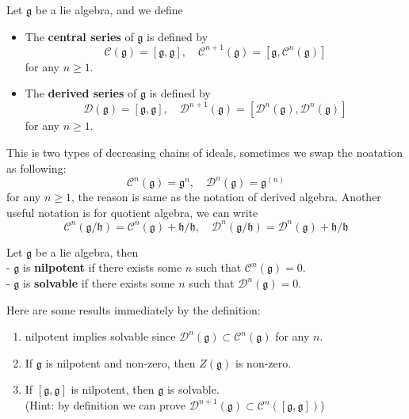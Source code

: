 \begin{definition}
    Let \(\mathfrak{g}\) be a lie algebra, and we define
    \begin{itemize}
        \item The \textbf{central series} of \(\mathfrak{g}\) is defined by
        \[\mathcal{C}(\mathfrak{g}) = [\mathfrak{g},\mathfrak{g}], \quad \mathcal{C}^{n+1}(\mathfrak{g}) = [\mathfrak{g}, \mathcal{C}^{n}(\mathfrak{g})]\]
        for any \(n \geq 1\).\\

        \item The \textbf{derived series} of \(\mathfrak{g}\) is defined by
        \[\mathcal{D}(\mathfrak{g}) = [\mathfrak{g},\mathfrak{g}], \quad \mathcal{D}^{n+1}(\mathfrak{g}) = [\mathcal{D}^{n}(\mathfrak{g}), \mathcal{D}^{n}(\mathfrak{g})]\]
        for any \(n \geq 1\).
    \end{itemize}
\end{definition}

This is two types of decreasing chains of ideals, sometimes we swap the noatation as following:
\[\mathcal{C}^n(\mathfrak{g}) = \mathfrak{g}^n, \quad \mathcal{D}^n(\mathfrak{g}) = \mathfrak{g}^{(n)}\]
for any \(n \geq 1\), the reason is same as the notation of derived algebra. Another useful notation is for quotient algebra, we can write
\[\mathcal{C}^n(\mathfrak{g}/\mathfrak{h}) = \mathcal{C}^n(\mathfrak{g}) + \mathfrak{h} / \mathfrak{h}, \quad \mathcal{D}^n(\mathfrak{g}/\mathfrak{h}) = \mathcal{D}^n(\mathfrak{g}) + \mathfrak{h} / \mathfrak{h}\]


\begin{colordefinition}
    Let \(\mathfrak{g}\) be a lie algebra, then\\

    - \(\mathfrak{g}\) is \textbf{nilpotent} if there exists some \(n\) such that \(\mathcal{C}^n(\mathfrak{g}) = 0\).\\

    - \(\mathfrak{g}\) is \textbf{solvable} if there exists some \(n\) such that \(\mathcal{D}^n(\mathfrak{g}) = 0\).
\end{colordefinition}

Here are some results immediately by the definition:
\begin{enumerate}
    \item nilpotent implies solvable since \(\mathcal{D}^n(\mathfrak{g}) \subset \mathcal{C}^n(\mathfrak{g})\) for any \(n\).
    \item If \(\mathfrak{g}\) is nilpotent and non-zero, then \(Z(\mathfrak{g})\) is non-zero.
    \item If \([\mathfrak{g},\mathfrak{g}]\) is nilpotent, then \(\mathfrak{g}\) is solvable.\\
    (Hint: by definition we can prove \(\mathcal{D}^{n+1}(\mathfrak{g}) \subset \mathcal{C}^n([\mathfrak{g},\mathfrak{g}])\))
\end{enumerate}


